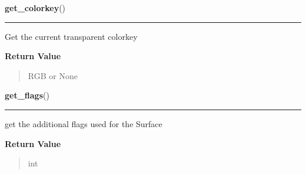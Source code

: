 \hspace{.8\funcindent}\begin{boxedminipage}{\funcwidth}

    \raggedright \textbf{get\_colorkey}()

    \vspace{-1.5ex}

    \rule{\textwidth}{0.5\fboxrule}
\setlength{\parskip}{2ex}
    Get the current transparent colorkey

\setlength{\parskip}{1ex}
      \textbf{Return Value}
    \vspace{-1ex}

      \begin{quote}
      RGB or None

      \end{quote}

    \end{boxedminipage}

    \label{pygame:Surface:get_flags}

    \vspace{0.5ex}

\hspace{.8\funcindent}\begin{boxedminipage}{\funcwidth}

    \raggedright \textbf{get\_flags}()

    \vspace{-1.5ex}

    \rule{\textwidth}{0.5\fboxrule}
\setlength{\parskip}{2ex}
    get the additional flags used for the Surface

\setlength{\parskip}{1ex}
      \textbf{Return Value}
    \vspace{-1ex}

      \begin{quote}
      int

      \end{quote}

    \end{boxedminipage}

    \label{pygame:Surface:get_height}

    \vspace{0.5ex}

